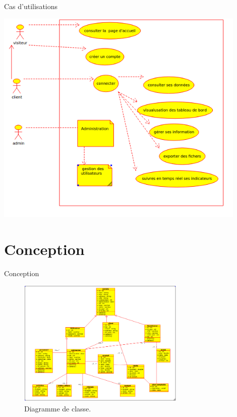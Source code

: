\documentclass[french]{beamer}
\begin{document}
\begin{frame}{Cas d'utilisations}
\begin{center}


\includegraphics[width=0.9\textwidth]{cd2.png}
\end{center}

\end{frame}


\section{Conception}
\begin{frame}{Conception}
\begin{center}
\begin{figure}[htp]
  \centering
  \includegraphics[width=8cm]{dc.png}
  \caption{Diagramme de classe.}
  \label{fig:une-autre-image}
\end{figure}

\end{center}	
	
	
\end{frame}
\end{document}
